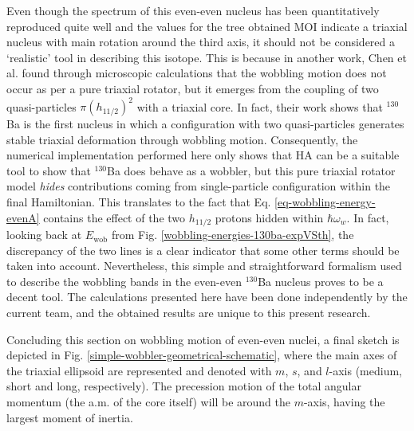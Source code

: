 Even though the spectrum of this even-even nucleus has been quantitatively reproduced quite well and the values for the tree obtained MOI indicate a triaxial nucleus with main rotation around the third axis, it should not be considered a `realistic' tool in describing this isotope. This is because in another work, Chen et al. \cite{chen2019transverse} found through microscopic calculations that the wobbling motion does not occur as per a pure triaxial rotator, but it emerges from the coupling of two quasi-particles $\pi(h_{11/2})^2$ with a triaxial core. In fact, their work shows that $^{130}$Ba is the first nucleus in which a configuration with two quasi-particles generates stable triaxial deformation through wobbling motion. Consequently, the numerical implementation performed here only shows that HA can be a suitable tool to show that $^{130}$Ba does behave as a wobbler, but this pure triaxial rotator model \emph{hides} contributions coming from single-particle configuration within the final Hamiltonian. This translates to the fact that Eq. \ref{eq-wobbling-energy-evenA} contains the effect of the two $h_{11/2}$ protons hidden within $\hbar\omega_w$. In fact, looking back at $E_\text{wob}$ from Fig. \ref{wobbling-energies-130ba-expVSth}, the discrepancy of the two lines is a clear indicator that some other terms should be taken into account. Nevertheless, this simple and straightforward formalism used to describe the wobbling bands in the even-even $^{130}$Ba nucleus proves to be a decent tool. The calculations presented here have been done independently by the current team, and the obtained results are unique to this present research.

Concluding this section on wobbling motion of even-even nuclei, a final sketch is depicted in Fig. \ref{simple-wobbler-geometrical-schematic}, where the main axes of the triaxial ellipsoid are represented and denoted with $m$, $s$, and $l$-axis (medium, short and long, respectively). The precession motion of the total angular momentum (the a.m. of the core itself) will be around the $m$-axis, having the largest moment of inertia.

